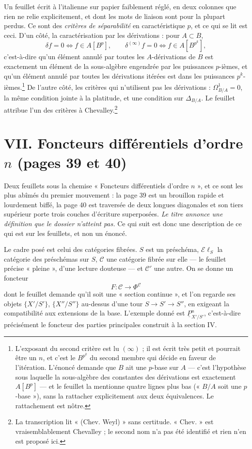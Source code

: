 \documentclass[11pt,a4paper]{article}
\begin{document}
Un feuillet écrit à l'italienne sur papier faiblement réglé, en deux colonnes
que rien ne relie explicitement, et dont les mots de liaison sont pour la
plupart perdus. Ce sont des \emph{critères de séparabilité} en caractéristique
$p$, et ce qui se lit est ceci. D'un côté, la caractérisation par les
dérivations : pour $A \subset B$,
\[
  \delta f = 0 \iff f \in A[B^{p}] ,
  \qquad
  \delta^{(\infty)} f = 0 \iff f \in A[B^{p^{k}}] ,
\]
c'est-à-dire qu'un élément annulé par toutes les $A$-dérivations de $B$ est
exactement un élément de la sous-algèbre engendrée par les puissances
$p$-ièmes, et qu'un élément annulé par toutes les dérivations
itérées est dans les puissances $p^{k}$-ièmes.\footnote{L'exposant du second
critère est lu $(\infty)$ ; il est écrit très petit et pourrait être un $n$, et
c'est le $B^{p^{k}}$ du second membre qui décide en faveur de l'itération.
L'énoncé demande que $B$ ait une $p$-base sur $A$ — c'est l'hypothèse sous
laquelle la sous-algèbre des constantes des dérivations est exactement
$A[B^{p}]$ — et le feuillet la mentionne quatre lignes plus bas
(« $B/A$ soit une $p$-base »), sans la rattacher explicitement aux deux
équivalences. Le rattachement est nôtre.} De l'autre côté, les critères qui
n'utilisent pas les dérivations : $\Omega^{1}_{B/A} = 0$, la même condition
jointe à la platitude, et une condition sur $\Delta_{B/A}$. Le feuillet attribue
l'un des critères à Chevalley.\footnote{La transcription lit « (Chev. Weyl) »
sans certitude. « Chev. » est vraisemblablement Chevalley ; le second nom n'a
pas été identifié et rien n'en est proposé ici.}

\section*{VII. Foncteurs différentiels d'ordre $n$ (pages 39 et 40)}

Deux feuillets sous la chemise « Foncteurs différentiels d'ordre $n$ », et ce
sont les plus abîmés du premier mouvement : la page 39 est un brouillon rapide
et lourdement biffé, la page 40 est traversée de deux longues diagonales et son
tiers supérieur porte trois couches d'écriture superposées. \emph{Le titre
annonce une définition que le dossier n'atteint pas.} Ce qui suit est donc une
description de ce qui est sur les feuillets, et non un énoncé.

Le cadre posé est celui des catégories fibrées. $S$ est un préschéma,
$\mathcal{E}\ell_{S}$ la catégorie des préschémas sur $S$, $\mathcal{C}$ une
catégorie fibrée sur elle — le feuillet précise « pleine », d'une lecture
douteuse — et $\mathcal{C}'$ une autre. On se donne un foncteur
\[
  F : \mathcal{C} \longrightarrow \Phi^{\mathcal{C}}
\]
dont le feuillet demande qu'il soit une « section continue », et l'on regarde
ses objets $\{X'/S'\}$, $\{X''/S''\}$ au-dessus d'une tour $S \to S' \to S''$,
en exigeant la compatibilité aux extensions de la base. L'exemple donné est
$\underline{P}^{n}_{X'/S'}$, c'est-à-dire précisément le foncteur des parties
principales construit à la section IV.
\end{document}
